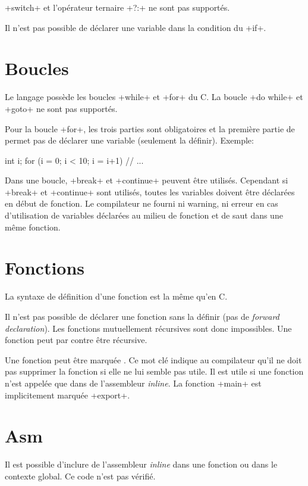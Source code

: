 \documentclass[a4paper]{article}
\begin{document}
    \imoc+switch+ et l'opérateur ternaire \imoc+?:+ ne sont pas supportés.

    Il n'est pas possible de déclarer une variable dans la condition du
    \imoc+if+.

  \section{Boucles}
    Le langage possède les boucles \imoc+while+ et \imoc+for+ du C. La boucle
    \imoc+do {} while+ et \imoc+goto+ ne sont pas supportés.

    Pour la boucle \imoc+for+, les trois parties sont obligatoires et la
    première partie de permet pas de déclarer une variable (seulement la
    définir). Exemple:

    \begin{moc}
int i;
for (i = 0; i < 10; i = i+1) {
    // ...
}
    \end{moc}

    Dans une boucle, \imoc+break+ et \imoc+continue+ peuvent être utilisés.
    Cependant si \imoc+break+ et \imoc+continue+ sont utilisés, toutes les
    variables doivent être déclarées en début de fonction. Le compilateur ne
    fourni ni warning, ni erreur en cas d'utilisation de variables déclarées au
    milieu de fonction et de saut dans une même fonction.

  \section{Fonctions}
    La syntaxe de définition d'une fonction est la même qu'en C.

    Il n'est pas possible de déclarer une fonction sans la définir (pas de
    \emph{forward declaration}). Les fonctions mutuellement récursives sont donc
    impossibles. Une fonction peut par contre être récursive.

    Une fonction peut être marquée . Ce mot clé indique au
    compilateur qu'il ne doit pas supprimer la fonction si elle ne lui semble
    pas utile. Il est utile si une fonction n'est appelée que dans de
    l'assembleur \emph{inline}. La fonction \imoc+main+ est implicitement
    marquée \imoc+export+.

  \section{Asm}
    Il est possible d'inclure de l'assembleur \emph{inline} dans une fonction ou
    dans le contexte global. Ce code n'est pas vérifié.
\end{document}
